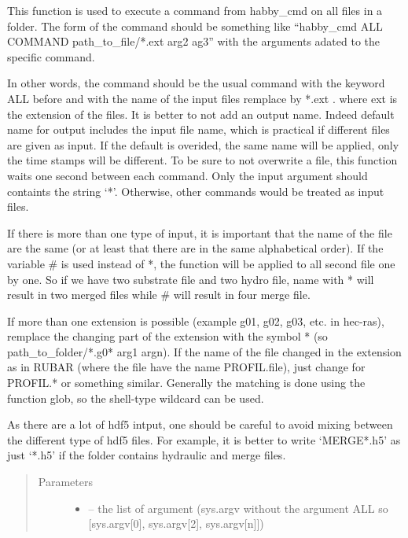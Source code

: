 \documentclass[letterpaper,10pt,english]{sphinxmanual}
\begin{document}
\begin{fulllineitems}
\label{\detokenize{index:src.func_for_cmd.habby_on_all}}
This function is used to execute a command from habby\_cmd on all files in a folder. The form of the command should
be something like ``habby\_cmd ALL COMMAND path\_to\_file/*.ext arg2 ag3'' with the arguments adated to the specific
command.

In other words, the command should be the usual command with the keyword ALL before and with the name of
the input files remplace by *.ext . where ext is the extension of the files.
It is better to not add an output name. Indeed default name for output includes the input file name, which
is practical if different files are given as input. If the default
is overided, the same name will be applied, only the time stamps will be different. To be sure to not overwrite a
file, this function waits one second between each command. Only the input argument should containts the string `*'.
Otherwise, other commands would be treated as input files.

If there is more than one type of input, it is important that the name of the file are the same (or at least
that there are in the same alphabetical order). If the variable \# is used instead of *, the function will be
applied to all second file one by one. So if we have two substrate file and two hydro file, name with * will result
in two merged files while \# will result in four merge file.

If more than one extension is possible (example g01, g02, g03, etc. in hec-ras), remplace the changing part of the
extension with the symbol * (so path\_to\_folder/*.g0* arg1 argn). If the name of the file changed in the extension
as in RUBAR (where the file have the name PROFIL.file), just change for PROFIL.* or something similar. Generally
the matching is done using the function glob, so the shell-type wildcard can be used.

As there are a lot of hdf5 intput, one should be careful to avoid mixing between the different type of hdf5 files.
For example, it is better to write `MERGE*.h5' as just `*.h5' if the folder contains hydraulic and merge files.
\begin{quote}\begin{description}
\item[{Parameters}] \leavevmode\begin{itemize}
\item {} 
 -- the list of argument (sys.argv without the argument ALL so {[}sys.argv{[}0{]}, sys.argv{[}2{]}, sys.argv{[}n{]}{]})


\end{itemize}
\end{description}
\end{quote}
\end{fulllineitems}
\end{document}
